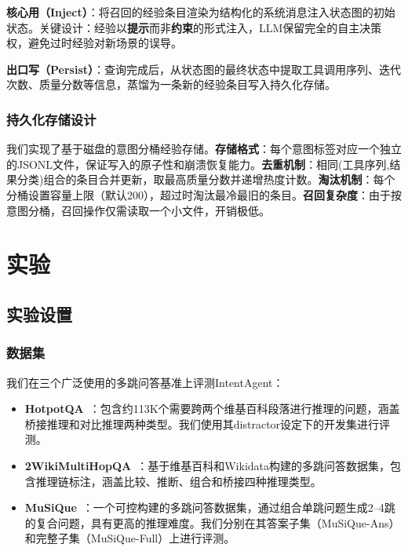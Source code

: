 \documentclass[runningheads]{llncs}
\begin{document}
\textbf{核心用（Inject）}：将召回的经验条目渲染为结构化的系统消息注入状态图的初始状态。关键设计：经验以\textbf{提示}而非\textbf{约束}的形式注入，LLM保留完全的自主决策权，避免过时经验对新场景的误导。

\textbf{出口写（Persist）}：查询完成后，从状态图的最终状态中提取工具调用序列、迭代次数、质量分数等信息，蒸馏为一条新的经验条目写入持久化存储。

\subsubsection{持久化存储设计}

我们实现了基于磁盘的意图分桶经验存储。\textbf{存储格式}：每个意图标签对应一个独立的JSONL文件，保证写入的原子性和崩溃恢复能力。\textbf{去重机制}：相同(工具序列,结果分类)组合的条目合并更新，取最高质量分数并递增热度计数。\textbf{淘汰机制}：每个分桶设置容量上限（默认200），超过时淘汰最冷最旧的条目。\textbf{召回复杂度}：由于按意图分桶，召回操作仅需读取一个小文件，开销极低。

\section{实验}

\subsection{实验设置}

\subsubsection{数据集}

我们在三个广泛使用的多跳问答基准上评测IntentAgent：

\begin{itemize}[leftmargin=*]
    \item \textbf{HotpotQA}~\cite{ref20}：包含约113K个需要跨两个维基百科段落进行推理的问题，涵盖桥接推理和对比推理两种类型。我们使用其distractor设定下的开发集进行评测。
    \item \textbf{2WikiMultiHopQA}~\cite{ref21}：基于维基百科和Wikidata构建的多跳问答数据集，包含推理链标注，涵盖比较、推断、组合和桥接四种推理类型。
    \item \textbf{MuSiQue}~\cite{ref22}：一个可控构建的多跳问答数据集，通过组合单跳问题生成2--4跳的复合问题，具有更高的推理难度。我们分别在其答案子集（MuSiQue-Ans）和完整子集（MuSiQue-Full）上进行评测。
\end{itemize}
\end{document}
